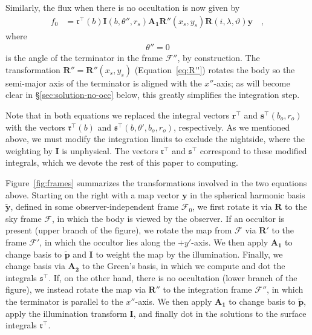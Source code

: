 \documentclass[modern]{aastex62}
\newcommand{\BF}[1]{\ensuremath{\mathbf{#1}}}
\newcommand{\sT}{\ensuremath{\mathfrak{s}^\top}}
\newcommand{\rT}{\ensuremath{\mathfrak{r}^\top}}
\newcommand{\sTe}{\ensuremath{\BF{s}^\top}}
\newcommand{\rTe}{\ensuremath{\BF{r}^\top}}
\newcommand{\bp}{\ensuremath{\tilde{\BF{p}}}}
\newcommand{\by}{\ensuremath{\tilde{\BF{y}}}}
\begin{document}
Similarly, the flux when there is no occultation is now given by
%
\begin{align}
    \label{eq:rTIA1RRy}
    f_0 & =
    \mathfrak{r}^\top(b)
    \BF{I}(b, \theta'', r_s)
    \BF{A_1}
    \BF{R}''(x_s, y_s)
    \BF{R}(i, \lambda, \vartheta)
    \BF{y}
    \quad,
\end{align}
%
where
%
\begin{align}
    \label{eq:theta''}
    \theta'' = 0
\end{align}
%
is the angle of the terminator in the frame $\mathcal{F}''$, by
construction. The transformation
$\BF{R}'' = \BF{R}''(x_s, y_s)$ (Equation~\ref{eq:R''}) rotates
the body so the semi-major axis of the terminator is aligned
with the $x''$-axis; as will become clear in \S\ref{sec:solution-no-occ} below,
this greatly simplifies the integration step.

Note that in both equations we replaced the integral vectors
$\rTe$ and $\sTe(b_o, r_o)$
with the vectors
$\mathfrak{r}^\top(b)$ and $\mathfrak{s}^\top(b, \theta', b_o, r_o)$,
respectively.
As we mentioned above, we must modify the integration limits to exclude the
nightside, where the weighting by $\BF{I}$ is unphysical.
The vectors $\mathfrak{r}^\top$ and $\mathfrak{s}^\top$ correspond to these
modified integrals, which we devote the rest of this paper to
computing.

Figure~\ref{fig:frames} summarizes the transformations involved in the two
equations above. Starting on the right with a map vector $\BF{y}$ in
the spherical harmonic basis $\by$, defined in some observer-independent frame
$\mathcal{F}_0$, we first rotate it via $\BF{R}$ to the sky frame
$\mathcal{F}$, in which the body is viewed by the
observer. If an occultor is present (upper branch of the figure),
we rotate the map from $\mathcal{F}$ via $\BF{R}'$ to the frame
$\mathcal{F}'$, in which the occultor lies along the
$+y'$-axis. We then apply $\BF{A_1}$ to change basis to $\bp$ and $\BF{I}$
to weight the map by the illumination. Finally, we change basis
via $\BF{A_2}$ to the Green's basis, in which we compute and dot the
integrals $\sT$.
If, on the other hand, there is no occultation (lower branch of the figure),
we instead rotate the map via $\BF{R}''$ to the integration frame
$\mathcal{F}''$, in which the terminator is parallel to the
$x''$-axis. We then apply $\BF{A_1}$ to change basis to $\bp$, apply the
illumination transform $\BF{I}$, and finally dot in the solutions to the
surface integrals $\rT$.

%
\end{document}
